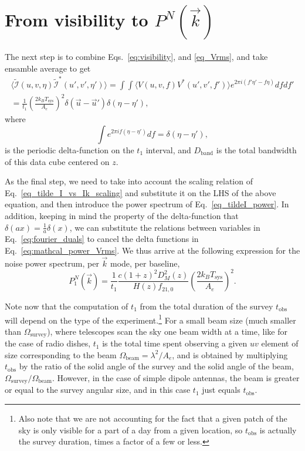 \documentclass[12pt]{paper}
\newcommand{\beq}{\begin{equation}}
\newcommand{\eeq}{\end{equation}}
\newcommand{\bga}{\begin{gathered}}
\newcommand{\ega}{\end{gathered}}
\begin{document}
\section{From visibility to $P^N(\vec k)$}

The next step is to combine Eqs.~\ref{eq:visibility}, and \ref{eq_Vrms}, and take ensamble average to get
\beq
\bga
\langle\widetilde{\mathcal{I}}(u,v,\eta) \widetilde{\mathcal{I}}^*(u',v',\eta')\rangle =  \int\int\langle V(u,v,f)V^*(u',v',f')\rangle e^{2\pi i(f'\eta'-f\eta)}dfdf'\\
= \frac{1}{t_1}\left(\frac{2k_BT_\text{sys}}{A_e}\right)^2 \delta(\vec{u}-\vec{u}')\delta(\eta-\eta'),
\ega
\label{eq:mathcal_power_Vrms}
\eeq 
where 
\beq
\int e^{2\pi i f(\eta-\eta')}df =\delta(\eta-\eta'),
\eeq
is the periodic delta-function on the $t_1$ interval, and $D_\text{band}$ is the total bandwidth of this data cube centered on $z$.  

As the final step, we need to take into account the scaling relation of Eq.~\ref{eq_tilde_I_vs_Ik_scaling} and substitute it on the LHS of the above equation, and then introduce the power spectrum of Eq.~\ref{eq_tildeI_power}. In addition, keeping in mind the property of the delta-function that $\delta(ax)=\frac{1}{a}\delta(x)$, we can substitute the relations between variables in Eq.~\ref{eq:fourier_duals} to cancel the delta functions in Eq.~\ref{eq:mathcal_power_Vrms}. We thus arrive at the following expression for the noise power spectrum, per $\vec k$ mode, per baseline,
\beq
P_1^N(\vec k) = \frac{1}{t_1}\frac{c(1+z)^2D_M^2(z)}{H(z)f_{21,0}}\left(\frac{2k_BT_\text{sys}}{A_e}\right)^2 .
\label{eq:Pnoise_1mode}
\eeq

Note now that the computation of $t_1$ from the total duration of the survey  $t_\text{obs}$ will depend on the type of the experiment.\footnote{Also note that we are not accounting for the fact that a given patch of the sky is only visible for a part of a day from a given location, so $t_\text{obs}$ is actually the survey duration, times a factor of a few or less.}  For a small beam size (much smaller than $\Omega_\text{survey}$), where telescopes scan the sky one beam width at a time, like for the case of radio dishes, $t_1$ is the total time spent observing a given $uv$ element of size corresponding to the beam $\Omega_\text{beam}=\lambda^2/A_e$, and is obtained by multiplying  $t_\text{obs}$ by the ratio of the solid angle of the survey and the solid angle of the beam, $\Omega_\text{survey}/\Omega_\text{beam}$. However, in the case of simple dipole antennas, the beam is greater or equal to the survey angular size, and in this case $t_1$ just equals $t_\text{obs}$.
\end{document}
